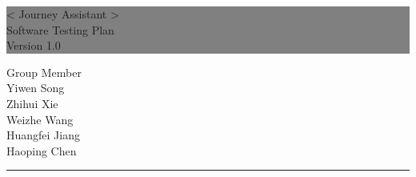 \documentclass[10pt]{article}
\begin{document}

\begin{titlepage} %
	
	
	\colorbox{grey}{
		\parbox[t]{1.1\textwidth}{ %
			\parbox[t]{1.02\textwidth}{ %
				\raggedleft %
				\fontsize{34pt}{40pt}\selectfont %
				\vspace{0.7cm} %
				
				< Journey Assistant >\\
                Software Testing Plan\\
                Version 1.0\\
				
				\vspace{0.7cm} %
			}
		}
	}
	
	\vfill %
	
	
	\parbox[t]{1\textwidth}{ %
		\raggedleft %
		\large %
		{\Large Group Member}\\[4pt] %
        Yiwen Song\\
        Zhihui Xie\\
        Weizhe Wang\\
        Huangfei Jiang\\
        Haoping Chen\\
		
		\hfill\rule{0.2\linewidth}{1pt}%
    }
    
	
\end{titlepage}
\end{document}
